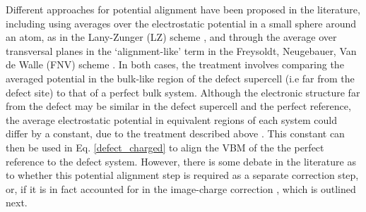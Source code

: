 \documentclass[11pt, twoside]{report}
\begin{document}
 Different approaches for potential alignment have been proposed in the literature, including using averages over the electrostatic potential in a small sphere around an atom, as in the Lany-Zunger (LZ) scheme \cite{Lany_defects}, and through the average over transversal planes in the `alignment-like' term in the Freysoldt, Neugebauer, Van de Walle (FNV) scheme \cite{FNV, kumagai_oba}. In both cases, the treatment involves comparing the averaged potential in the bulk-like region of the defect supercell (i.e far from the defect site) to that of a perfect bulk system. Although the electronic structure far from the defect may be similar in the defect supercell and the perfect reference, the average electrostatic potential in equivalent regions of each system could differ by a constant, due to the treatment described above \cite{komsa}. This constant can then be used in Eq. \ref{defect_charged} to align the VBM of the the perfect reference to the defect system.
 However, there is some debate in the literature as to whether this potential alignment step is required as a separate correction step, or, if it is in fact accounted for in the image-charge correction \cite{kumagai_oba}, which is outlined next.
\end{document}

